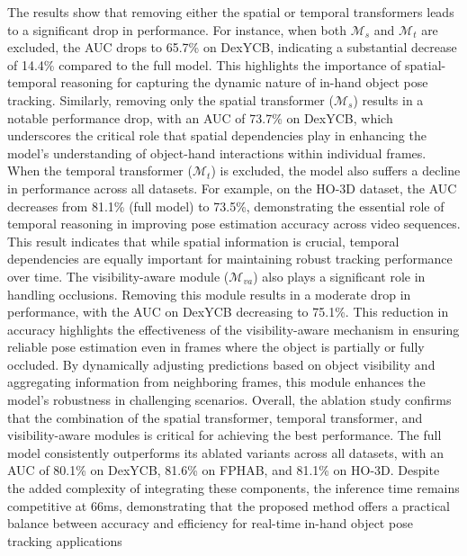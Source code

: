 The results show that removing either the spatial or temporal transformers leads to a significant drop in performance. For instance, when both $\mathcal{M}_{s}$ and $\mathcal{M}_{t}$ are excluded, the AUC drops to 65.7\% on DexYCB, indicating a substantial decrease of 14.4\% compared to the full model. This highlights the importance of spatial-temporal reasoning for capturing the dynamic nature of in-hand object pose tracking. Similarly, removing only the spatial transformer ($\mathcal{M}_{s}$) results in a notable performance drop, with an AUC of 73.7\% on DexYCB, which underscores the critical role that spatial dependencies play in enhancing the model's understanding of object-hand interactions within individual frames. When the temporal transformer ($\mathcal{M}_{t}$) is excluded, the model also suffers a decline in performance across all datasets. For example, on the HO-3D dataset, the AUC decreases from 81.1\% (full model) to 73.5\%, demonstrating the essential role of temporal reasoning in improving pose estimation accuracy across video sequences. This result indicates that while spatial information is crucial, temporal dependencies are equally important for maintaining robust tracking performance over time. The visibility-aware module ($\mathcal{M}_{va}$) also plays a significant role in handling occlusions. Removing this module results in a moderate drop in performance, with the AUC on DexYCB decreasing to 75.1\%. This reduction in accuracy highlights the effectiveness of the visibility-aware mechanism in ensuring reliable pose estimation even in frames where the object is partially or fully occluded. By dynamically adjusting predictions based on object visibility and aggregating information from neighboring frames, this module enhances the model's robustness in challenging scenarios. Overall, the ablation study confirms that the combination of the spatial transformer, temporal transformer, and visibility-aware modules is critical for achieving the best performance. The full model consistently outperforms its ablated variants across all datasets, with an AUC of 80.1\% on DexYCB, 81.6\% on FPHAB, and 81.1\% on HO-3D. Despite the added complexity of integrating these components, the inference time remains competitive at 66ms, demonstrating that the proposed method offers a practical balance between accuracy and efficiency for real-time in-hand object pose tracking applications\DIFaddbegin {}

\subsection{}

